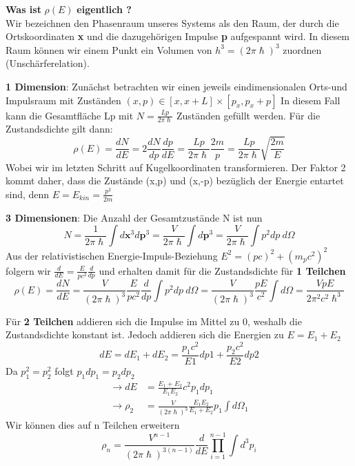 \documentclass[Ex4_Zusammenfassung.tex]{subfiles}
\begin{document}
\textbf{Was ist} $\rho(E)$ \textbf{eigentlich ?}
\ \\ \newline
Wir bezeichnen den Phasenraum unseres Systems als den Raum, der durch die Ortskoordinaten \textbf{x} und die dazugehörigen Impulse \textbf{p} aufgespannt wird. In diesem Raum können wir einem Punkt ein Volumen von $ h^3 = (2\pi \hslash)^3 $ zuordnen (Unschärferelation). \newline 

\textbf{1 Dimension}: \newline
Zunächst betrachten wir einen jeweils eindimensionalen Orts-und Impulsraum mit Zuständen $ (x,p) \in  [x,x+L] \times [p_{x},p_{x}+p] $ In diesem Fall kann die Gesamtfläche Lp mit $ N = \frac{Lp}{2\pi \hslash} $ Zuständen gefüllt werden. Für die Zustandsdichte gilt dann: 
\begin{equation}
 \rho(E) = \frac{dN}{dE} = 2 \frac{dN}{dp} \frac{dp}{dE} = \frac{Lp}{2\pi \hslash} \frac{2m}{p} =  \frac{Lp}{2\pi \hslash} \sqrt{\frac{2m}{E}} 
 \end{equation}
 Wobei wir im letzten Schritt auf Kugelkoordinaten transformieren. 
 Der Faktor 2 kommt daher, dass die Zustände (x,p) und (x,-p) bezüglich der Energie entartet sind, denn $ E = E_{kin} = \frac{p^2}{2m} $ \newline
 
 \textbf{3 Dimensionen}: \newline
 Die Anzahl der Gesamtzustände N ist nun
 \begin{equation}
 N = \frac{1}{2 \pi \hslash} \int d\textbf{x}^3 d\textbf{p}^3 = \frac{V}{2 \pi \hslash} \int d\textbf{p}^3 = \frac{V}{2 \pi \hslash} \int p^2 dp \  d\Omega 
 \end{equation}
 Aus der relativistischen Energie-Impuls-Beziehung $ E^2 = (pc)^2 +  (m_pc^2)^2 $ folgern wir $ \frac{d}{dE} = \frac{E}{pc^2} \frac{d}{dp} $ und erhalten damit für die Zustandsdichte für \textbf{1 Teilchen}
 \begin{equation}
\rho(E) = \frac{dN}{dE} = \frac{V}{(2 \pi \hslash)^3}  \frac{E}{pc^2} \frac{d}{dp}  \int p^2 dp \  d\Omega =  \frac{V}{(2 \pi \hslash)^3} \frac{pE}{c^2} \int d\Omega = \frac{VpE}{2 \pi^2 c^2 \hslash^3}
\end{equation}

Für \textbf{2 Teilchen} addieren sich die Impulse im Mittel zu 0, weshalb die Zustandsdichte konstant ist. Jedoch addieren sich die Energien zu $ E = E_1 + E_2 $
\begin{equation}
dE = dE_1 + dE_2 = \frac{p_1c^2}{E1} dp1 + \frac{p_2c^2}{E2} dp2
\end {equation}
Da $ p_1^2 = p_2^2 $ folgt $  p_1 dp_{1} = p_2 dp_{2} $ 
\begin{align*}
\rightarrow  dE &= \frac{E_1 + E_2}{E_1E_2} c^2 p_1 dp_1  \\
\rightarrow  \rho_2 &=   \frac{V}{(2 \pi \hslash)^3} \frac{E_1E_2}{E_1+E_2} p_{1} \int d\Omega_{1}
\end{align*}
\newpage
Wir können dies auf n Teilchen erweitern
\begin{equation}
\rho_{n} = \frac{V^{n-1}}{(2 \pi \hslash)^{3(n-1)}} \frac{d}{dE} \prod_{i=1}^{n-1} \int d^3p_{i} 
\end{equation}
\end{document}
